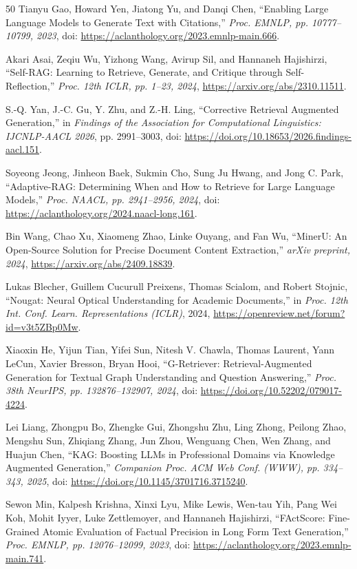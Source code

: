\documentclass[conference,a4paper]{IEEEtran}
\begin{document}
\begin{thebibliography}{50}
 Tianyu Gao, Howard Yen, Jiatong Yu, and Danqi Chen, ``Enabling Large Language Models to Generate Text with Citations,'' \emph{Proc. EMNLP, pp. 10777--10799, 2023}, doi: \url{https://aclanthology.org/2023.emnlp-main.666}.

 Akari Asai, Zeqiu Wu, Yizhong Wang, Avirup Sil, and Hannaneh Hajishirzi, ``Self-RAG: Learning to Retrieve, Generate, and Critique through Self-Reflection,'' \emph{Proc. 12th ICLR, pp. 1--23, 2024}, \url{https://arxiv.org/abs/2310.11511}.

 S.-Q. Yan, J.-C. Gu, Y. Zhu, and Z.-H. Ling, ``Corrective Retrieval Augmented Generation,'' in \emph{Findings of the Association for Computational Linguistics: IJCNLP-AACL 2026}, pp. 2991--3003, doi: \url{https://doi.org/10.18653/2026.findings-aacl.151}.

 Soyeong Jeong, Jinheon Baek, Sukmin Cho, Sung Ju Hwang, and Jong C. Park, ``Adaptive-RAG: Determining When and How to Retrieve for Large Language Models,'' \emph{Proc. NAACL, pp. 2941--2956, 2024}, doi: \url{https://aclanthology.org/2024.naacl-long.161}.

 Bin Wang, Chao Xu, Xiaomeng Zhao, Linke Ouyang, and Fan Wu, ``MinerU: An Open-Source Solution for Precise Document Content Extraction,'' \emph{arXiv preprint, 2024}, \url{https://arxiv.org/abs/2409.18839}.

 Lukas Blecher, Guillem Cucurull Preixens, Thomas Scialom, and Robert Stojnic, ``Nougat: Neural Optical Understanding for Academic Documents,'' in \emph{Proc. 12th Int. Conf. Learn. Representations (ICLR)}, 2024, \url{https://openreview.net/forum?id=v3t5ZBp0Mw}.

 Xiaoxin He, Yijun Tian, Yifei Sun, Nitesh V. Chawla, Thomas Laurent, Yann LeCun, Xavier Bresson, Bryan Hooi, ``G-Retriever: Retrieval-Augmented Generation for Textual Graph Understanding and Question Answering,'' \emph{Proc. 38th NeurIPS, pp. 132876--132907, 2024}, doi: \url{https://doi.org/10.52202/079017-4224}.

 Lei Liang, Zhongpu Bo, Zhengke Gui, Zhongshu Zhu, Ling Zhong, Peilong Zhao, Mengshu Sun, Zhiqiang Zhang, Jun Zhou, Wenguang Chen, Wen Zhang, and Huajun Chen, ``KAG: Boosting LLMs in Professional Domains via Knowledge Augmented Generation,'' \emph{Companion Proc. ACM Web Conf. (WWW), pp. 334--343, 2025}, doi: \url{https://doi.org/10.1145/3701716.3715240}.

 Sewon Min, Kalpesh Krishna, Xinxi Lyu, Mike Lewis, Wen-tau Yih, Pang Wei Koh, Mohit Iyyer, Luke Zettlemoyer, and Hannaneh Hajishirzi, ``FActScore: Fine-Grained Atomic Evaluation of Factual Precision in Long Form Text Generation,'' \emph{Proc. EMNLP, pp. 12076--12099, 2023}, doi: \url{https://aclanthology.org/2023.emnlp-main.741}.

\end{thebibliography}
\endgroup
\end{document}
